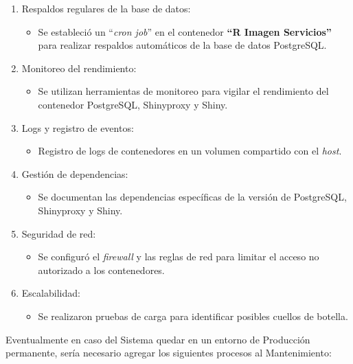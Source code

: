 \documentclass[
  12pt,
  openany]{book}
\providecommand{\tightlist}{%
  \setlength{\itemsep}{0pt}\setlength{\parskip}{0pt}}
\begin{document}
\begin{enumerate}
\def\labelenumi{\arabic{enumi}.}
\item
  Respaldos regulares de la base de datos:

  \begin{itemize}
  \tightlist
  \item
    Se estableció un ``\emph{cron job}'' en el contenedor \textbf{``R Imagen Servicios''} para realizar respaldos automáticos de la base de datos PostgreSQL.
  \end{itemize}
\item
  Monitoreo del rendimiento:

  \begin{itemize}
  \tightlist
  \item
    Se utilizan herramientas de monitoreo para vigilar el rendimiento del contenedor PostgreSQL, Shinyproxy y Shiny.
  \end{itemize}
\item
  Logs y registro de eventos:

  \begin{itemize}
  \tightlist
  \item
    Registro de logs de contenedores en un volumen compartido con el \emph{host}.
  \end{itemize}
\item
  Gestión de dependencias:

  \begin{itemize}
  \tightlist
  \item
    Se documentan las dependencias específicas de la versión de PostgreSQL, Shinyproxy y Shiny.
  \end{itemize}
\item
  Seguridad de red:

  \begin{itemize}
  \tightlist
  \item
    Se configuró el \emph{firewall} y las reglas de red para limitar el acceso no autorizado a los contenedores.
  \end{itemize}
\item
  Escalabilidad:

  \begin{itemize}
  \tightlist
  \item
    Se realizaron pruebas de carga para identificar posibles cuellos de botella.
  \end{itemize}
\end{enumerate}

Eventualmente en caso del Sistema quedar en un entorno de Producción permanente, sería necesario agregar los siguientes procesos al Mantenimiento:
\end{document}

